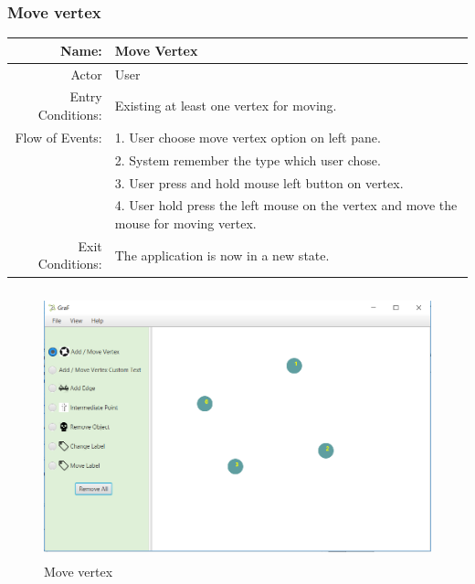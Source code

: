 \documentclass[a4paper,10pt]{article}
\begin{document}
\subsubsection{Move vertex}
	\begin{tabular}{|r|l|}
\hline
Name: & Move Vertex \\
\hline
Actor & User \\
\hline
Entry Conditions: & Existing at least one vertex for moving. \\
\hline
Flow of Events: & 1. User choose move vertex option on left pane. \\
& 2. System remember the type which user chose.  \\
& 3. User press and hold mouse left button on vertex.  \\
& 4. User hold press the left mouse on the vertex and move the mouse for moving vertex.  \\
\hline
Exit Conditions: & The application is now in a new state. \\
\hline

\end{tabular}
	\paragraph{}
	
\begin{figure}[H]
		\centering
		\includegraphics[height = 3in]{drawVertex.png}
		\caption[Optional caption]{Move vertex}
		\label{fig:Repository}
	\end{figure}
\paragraph{}
\end{document}
